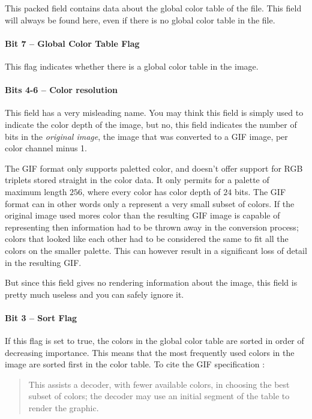 This packed field contains data about the global color table of the
file. This field will always be found here, even if there is no global
color table in the file.

\paragraph{Bit 7 --  Global Color Table Flag}

This flag indicates whether there is a global color table in the
image.

\paragraph{Bits 4-6 -- Color resolution}

This field has a very misleading name. You may think this field is
simply used to indicate the color depth of the image, but no, this
field indicates the number of bits in the \textit{original image}, the
image that was converted to a GIF image, per color channel minus 1.

The GIF format only supports paletted color, and doesn't offer support
for RGB triplets stored straight in the color data. It only permits
for a palette of maximum length $256$, where every color has color
depth of $24$ bits. The GIF format can in other words only a represent
a very small subset of colors. If the original image used mores color
than the resulting GIF image is capable of representing then
information had to be thrown away in the conversion process; colors
that looked like each other had to be considered the same to fit all
the colors on the smaller palette. This can however result in a
significant loss of detail in the resulting GIF.

But since this field gives no rendering information about the image,
this field is pretty much useless and you can safely ignore it.

\paragraph{Bit 3 -- Sort Flag}

If this flag is set to true, the colors in the global color table are
sorted in order of decreasing importance. This means that the most
frequently used colors in the image are sorted first in the color
table. To cite the GIF specification \cite{gif89a}:

\begin{quote}
  This assists a decoder, with fewer available colors, in choosing
  the best subset of colors; the decoder may use an initial segment
  of the table to render the graphic.
\end{quote}

